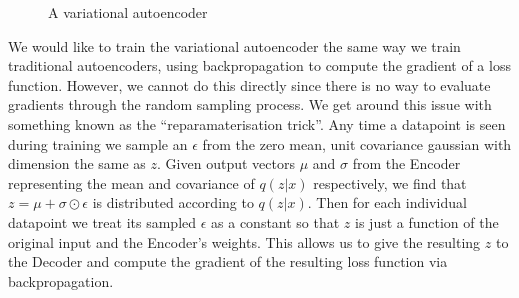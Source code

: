 \documentclass{article}
\numberwithin{figure}{section}
\theoremstyle{definition}
\begin{document}
\begin{figure}[h]
  \caption{A variational autoencoder}
\end{figure}

We would like to train the variational autoencoder the same way we train traditional autoencoders, using backpropagation to compute the gradient of a loss function.
However, we cannot do this directly since there is no way to evaluate gradients through the random sampling process.
We get around this issue with something known as the ``reparamaterisation trick''.
Any time a datapoint is seen during training we sample an $\epsilon$ from the zero mean, unit covariance gaussian with dimension the same as $z$.
Given output vectors $\mu$ and $\sigma$ from the Encoder representing the mean and covariance of $q(z|x)$ respectively, we find that $z = \mu + \sigma \odot \epsilon$ is distributed according to $q(z|x)$.
Then for each individual datapoint we treat its sampled $\epsilon$ as a constant so that $z$ is just a function of the original input and the Encoder's weights.
This allows us to give the resulting $z$ to the Decoder and compute the gradient of the resulting loss function via backpropagation.
\end{document}
